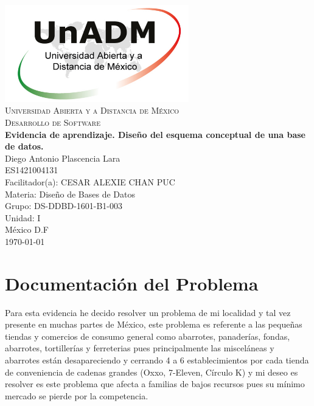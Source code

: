 \documentclass[spanish,12pt,letterpapper]{article}
\begin{document}
	\begin{titlepage}
		\begin{center}
			\includegraphics[width=0.6\textwidth]{../logoUnADM}~\\[1cm] 
			\textsc{Universidad Abierta y a Distancia de México}\\[0.8cm]
			\textsc{Desarrollo de Software}\\[1.8cm]
			
			\textbf{ \Large Evidencia de aprendizaje. Diseño del esquema conceptual de una base de datos.}\\[3cm]
			
			Diego Antonio Plascencia Lara\\ ES1421004131 \\[0.4cm]
			Facilitador(a): CESAR ALEXIE CHAN PUC  \\
			Materia: Diseño de Bases de Datos\\
			Grupo: DS-DDBD-1601-B1-003 \\
			Unidad: I \\
			
			\vfill México D.F\\{\today}
			
		\end{center}
	\end{titlepage}
	
	\section{Documentación del Problema}
	
	Para esta evidencia he decido resolver un problema de mi localidad y tal vez presente en muchas partes de México, este problema es referente a las pequeñas tiendas y comercios de consumo general como abarrotes, panaderías, fondas, abarrotes, tortillerías y ferreterias   pues principalmente las misceláneas y abarrotes están desapareciendo y cerrando 4 a 6 establecimientos por cada tienda de conveniencia de cadenas grandes (Oxxo, 7-Eleven, Círculo K) y mi deseo es resolver es este problema que afecta a familias de bajos recursos pues su mínimo mercado se pierde por la competencia.\\
	
\end{document}
